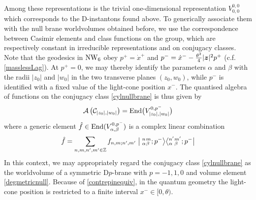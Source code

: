 Among these representations is the trivial one-dimensional representation
$V_{0,0}^{0,0}$ which corresponds to the D-instantons found above. To
generically associate them with the null brane worldvolumes obtained before, we
use the correspondence between Casimir elements and class functions on the
group, which are respectively constant in irreducible representations and on
conjugacy classes. Note that the geodesics in $\operatorname{NW}_6$ obey $p^+=\dot x^+$ and
$p^-=\dot x^--\frac{\theta^2}4 |{{\boldsymbol {z} }}|^2 p^+$ (c.f. \eqref{masslessLag}). At $p^+=0$,
we may thereby identify the parameters $\alpha$ and $\beta$ with the radii
$|z_0|$ and $|w_0|$ in the two transverse planes $(z_0,w_0)$, while $p^-$ is
identified with a fixed value of the light-cone position $x^-$. The quantised
algebra of functions on the conjugacy class \eqref{cylnullbrane} is thus given
by
\begin{equation}
  \label{quantalgnullbrane}
  \mathcal{A}\left(\mathcal{C}_{|z_0|,|w_0|}\right)=
  {\rm End}\bigl(V_{|z_0|,|w_0|}^{0,p^-}\bigr)
\end{equation}
where a generic element $\hat f\in{\rm End}(V_{\alpha,\beta}^{0,p^-})$ is a
complex linear combination
\begin{equation}
  \label{contreplincomb}
  \hat
  f=\sum_{n,m,n',m'\in{\mathbb Z}}f_{n,m;n',m'}\bigm| {}^n_\alpha {}^m_\beta
  ; p^-\bigr\rangle\bigl\langle {}^{n'}_\alpha {}^{m'}_\beta
  ; p^-\bigr|
\end{equation}
In this context, we may appropriately regard the conjugacy class
\eqref{cylnullbrane} as the worldvolume of a symmetric D$p$-brane with
$p=-1,1,0$ and volume element \eqref{degmetricnull}. Because of
\eqref{contrepinequiv}, in the quantum geometry the light-cone position is
restricted to a finite interval $x^-\in[0,\theta)$.

